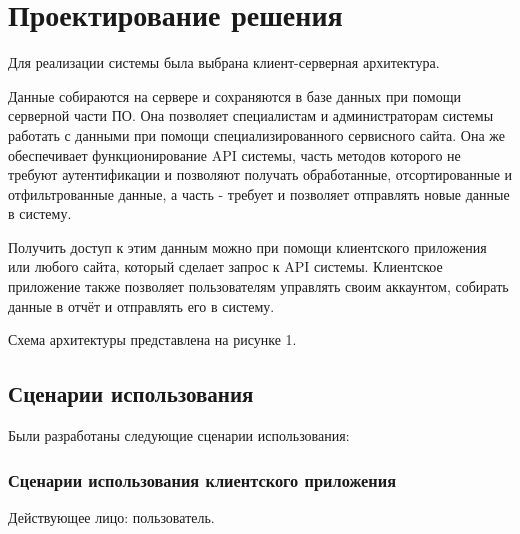 
\section{Проектирование решения}

\tab
Для реализации системы была выбрана клиент-серверная архитектура.

\tab
Данные собираются на сервере и сохраняются в базе данных при помощи серверной части ПО.
Она позволяет специалистам и администраторам системы работать с данными при помощи специализированного сервисного сайта.
Она же обеспечивает функционирование API системы, часть методов которого не требуют аутентификации и позволяют получать обработанные, отсортированные и отфильтрованные данные, а часть - требует и позволяет отправлять новые данные в систему.

\tab
Получить доступ к этим данным можно при помощи клиентского приложения или любого сайта, который сделает запрос к API системы.
Клиентское приложение также позволяет пользователям управлять своим аккаунтом, собирать данные в отчёт и отправлять его в систему.

\tab
Схема архитектуры представлена на рисунке 1.
\pictureone

\subsection{Сценарии использования}

\tab
Были разработаны следующие сценарии использования:

\subsubsection{Сценарии использования клиентского приложения}

\tab
Действующее лицо: пользователь.

